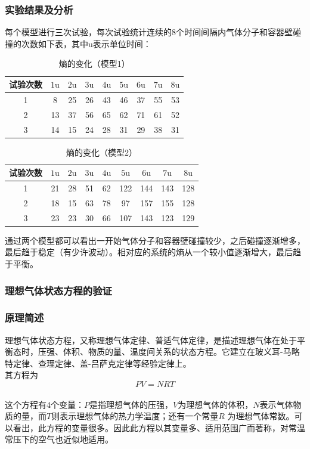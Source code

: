 ﻿\documentclass{article}
\begin{document}
	\subsubsection*{实验结果及分析}
	每个模型进行三次试验，每次试验统计连续的8个时间间隔内气体分子和容器壁碰撞的次数如下表，其中$\mathrm{u}$表示单位时间：
	\begin{table}[H]
		\centering
		\caption{\label{tab:a}熵的变化（模型1）}
		\begin{tabular}{ccccccccc}
			\toprule
			试验次数 & $1\mathrm{u}$ & $2\mathrm{u}$ & $3\mathrm{u}$ & $4\mathrm{u}$ & $5\mathrm{u}$ & $6\mathrm{u}$ & $7\mathrm{u}$ & $8\mathrm{u}$\\
			\midrule
			1 &   8  & 25 & 26 & 43 & 46 & 37 & 55 & 53 \\
			2 &   13 & 37 & 56 & 65 & 62 & 71 & 61 & 52 \\
			3 &   14 & 15 & 24 & 28 & 31 & 29 & 38 & 31 \\
			\bottomrule
		\end{tabular}
	\end{table}
	\begin{table}[H]
		\centering
		\caption{\label{tab:a}熵的变化（模型2）}
		\begin{tabular}{ccccccccc}
			\toprule
			试验次数 & $1\mathrm{u}$ & $2\mathrm{u}$ & $3\mathrm{u}$ & $4\mathrm{u}$ & $5\mathrm{u}$ & $6\mathrm{u}$ & $7\mathrm{u}$ & $8\mathrm{u}$\\
			\midrule
			1 &   21 & 28 & 51 & 62 & 122 & 144 & 143 & 128 \\
			2 &   18 & 15 & 63 & 78 & 97 & 157 & 155 & 128 \\
			3 &   23 & 23 & 30 & 66 & 107 & 143 & 123 & 129 \\
			\bottomrule
		\end{tabular}
	\end{table}
	通过两个模型都可以看出一开始气体分子和容器壁碰撞较少，之后碰撞逐渐增多，最后趋于稳定（有少许波动）。相对应的系统的熵从一个较小值逐渐增大，最后趋于平衡。
	\subsubsection{理想气体状态方程的验证}
	\subsubsection*{原理简述}
	理想气体状态方程，又称理想气体定律、普适气体定律，是描述理想气体在处于平衡态时，压强、体积、物质的量、温度间关系的状态方程。它建立在玻义耳-马略特定律、查理定律、盖-吕萨克定律等经验定律上。\\
	其方程为\[PV = NRT\]\\这个方程有$4$个变量：$P$是指理想气体的压强，$V$为理想气体的体积，$N$表示气体物质的量，而$T$则表示理想气体的热力学温度；还有一个常量$R$ 为理想气体常数。可以看出，此方程的变量很多。因此此方程以其变量多、适用范围广而著称，对常温常压下的空气也近似地适用。
\end{document}
